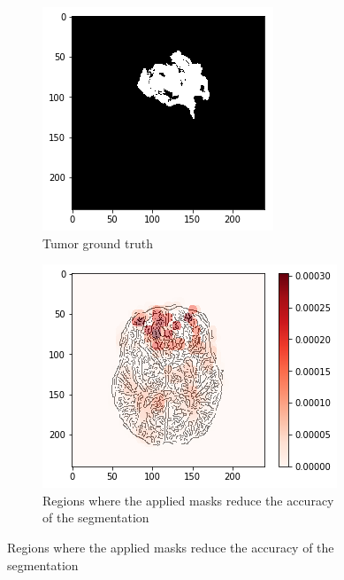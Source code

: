 \begin{figure}[H]
\begin{subfigure}[t]{.4\textwidth}
        \includegraphics[width=\linewidth]{chapters/06_hdm/c_Brats18_2013_17_1_L1/40.png}
        \caption{Tumor ground truth}
    \end{subfigure}
    \begin{subfigure}[t]{.45\textwidth}
        \centering
        \includegraphics[width=\linewidth]{chapters/06_hdm/c_Brats18_2013_17_1_L1/43.png}
        \caption{Regions where the applied masks reduce the accuracy of the segmentation}
    \end{subfigure}\hspace{1cm}%

\end{figure}
